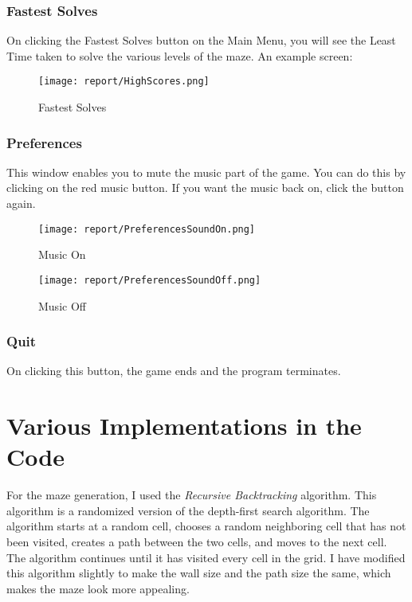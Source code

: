 \documentclass{article}
\begin{document}
\subsubsection{Fastest Solves}
On clicking the Fastest Solves button on the Main Menu, you will see the Least Time taken to solve the various levels of the maze. An example screen:

\begin{figure}[h]
    \centering
    \texttt{[image: report/HighScores.png]}
    \caption{Fastest Solves}
\end{figure}

\subsubsection{Preferences}
This window enables you to mute the music part of the game. You can do this by clicking on the red music button. If you want the music back on, click the button again.

\begin{figure}[h]
    \centering
    \texttt{[image: report/PreferencesSoundOn.png]}
    \caption{Music On}
\end{figure}

\begin{figure}[h]
    \centering
    \texttt{[image: report/PreferencesSoundOff.png]}
    \caption{Music Off}
\end{figure}

\subsubsection{Quit}
On clicking this button, the game ends and the program terminates.

\section{Various Implementations in the Code}
For the maze generation, I used the \textit{Recursive Backtracking} algorithm. This algorithm is a randomized version of the depth-first search algorithm. The algorithm starts at a random cell, chooses a random neighboring cell that has not been visited, creates a path between the two cells, and moves to the next cell. The algorithm continues until it has visited every cell in the grid. I have modified this algorithm slightly to make the wall size and the path size the same, which makes the maze look more appealing.
\end{document}
